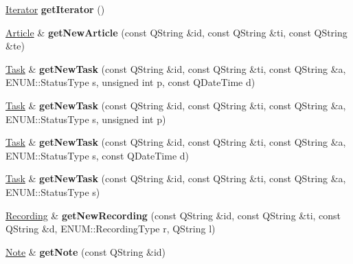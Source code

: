 \begin{DoxyCompactItemize}
\hyperlink{class_notes_manager_1_1_iterator}{Iterator} {\bfseries get\+Iterator} ()
\item 
\mbox{\label{class_notes_manager_afa44d5b479d01362a21a0aa5021cd340}} 
\hyperlink{class_article}{Article} \& {\bfseries get\+New\+Article} (const Q\+String \&id, const Q\+String \&ti, const Q\+String \&te)
\item 
\mbox{\label{class_notes_manager_a44cca3e307d7f7453b2d3080d7cb42be}} 
\hyperlink{class_task}{Task} \& {\bfseries get\+New\+Task} (const Q\+String \&id, const Q\+String \&ti, const Q\+String \&a, E\+N\+U\+M\+::\+Status\+Type s, unsigned int p, const Q\+Date\+Time d)
\item 
\mbox{\label{class_notes_manager_aad0991ce10ef7e3329986d6b76ff4667}} 
\hyperlink{class_task}{Task} \& {\bfseries get\+New\+Task} (const Q\+String \&id, const Q\+String \&ti, const Q\+String \&a, E\+N\+U\+M\+::\+Status\+Type s, unsigned int p)
\item 
\mbox{\label{class_notes_manager_ade9ba3a4fb0090079d30a83faf47855c}} 
\hyperlink{class_task}{Task} \& {\bfseries get\+New\+Task} (const Q\+String \&id, const Q\+String \&ti, const Q\+String \&a, E\+N\+U\+M\+::\+Status\+Type s, const Q\+Date\+Time d)
\item 
\mbox{\label{class_notes_manager_a9d7f624981c238451a2cecb4a443da57}} 
\hyperlink{class_task}{Task} \& {\bfseries get\+New\+Task} (const Q\+String \&id, const Q\+String \&ti, const Q\+String \&a, E\+N\+U\+M\+::\+Status\+Type s)
\item 
\mbox{\label{class_notes_manager_aa2d502c467aa99f8b3c0e93f1ca8d2a2}} 
\hyperlink{class_recording}{Recording} \& {\bfseries get\+New\+Recording} (const Q\+String \&id, const Q\+String \&ti, const Q\+String \&d, E\+N\+U\+M\+::\+Recording\+Type r, Q\+String l)
\item 
\mbox{\label{class_notes_manager_ab5f91202dd3f49047a721bb2149f3f49}} 
\hyperlink{class_note}{Note} \& {\bfseries get\+Note} (const Q\+String \&id)
\item 
\mbox{\label{class_notes_manager_a989429244c36c35ef68204f6ae2a0a5f}} 

\end{DoxyCompactItemize}
